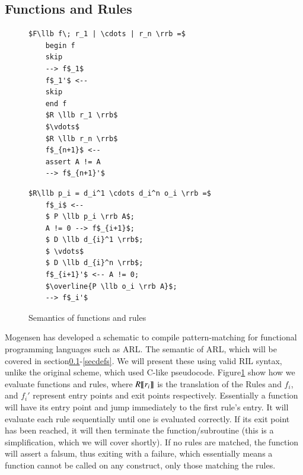 \documentclass[a4paper]{article}
\begin{document}
\subsection{Functions and Rules}
\label{secrules}
\begin{figure}[!htb]
\begin{minipage}{0.4\textwidth}
\begin{lstlisting}
$F\llb f\; r_1 | \cdots | r_n \rrb =$
    begin f
    skip
    --> f$_1$
    f$_1'$ <--
    skip
    end f
    $R \llb r_1 \rrb$
    $\vdots$
    $R \llb r_n \rrb$
    f$_{n+1}$ <--
    assert A != A
    --> f$_{n+1}'$
\end{lstlisting}
\end{minipage}
\qquad
\begin{minipage}{0.4\textwidth}
\begin{lstlisting}
$R\llb p_i = d_i^1 \cdots d_i^n o_i \rrb =$
    f$_i$ <--
    $ P \llb p_i \rrb A$;
    A != 0 --> f$_{i+1}$;
    $ D \llb d_{i}^1 \rrb$;
    $ \vdots$
    $ D \llb d_{i}^n \rrb$;
    f$_{i+1}'$ <-- A != 0;
    $\overline{P \llb o_i \rrb A}$;
    --> f$_i'$
\end{lstlisting}
\end{minipage}
\caption{Semantics of functions and rules}
\label{rules}
\end{figure}

Mogensen has developed a schematic to compile pattern-matching for functional programming languages such as ARL\cite{patterns}. The semantic of ARL, which will be covered in section\ref{secrules}-\ref{secdefs}. We will present these using valid RIL syntax, unlike the original scheme, which used C-like pseudocode. Figure\ref{rules} show how we evaluate functions and rules, where \(R \llbracket r_i \rrbracket\) is the translation of the Rules and \(f_i\), and  \(f_i'\) represent entry points and exit points respectively. Essentially a function will have its entry point and jump immediately to the first rule's entry. It will evaluate each rule sequentially until one is evaluated correctly. If its exit point has been reached, it will then terminate the function/subroutine (this is a simplification, which we will cover shortly). If no rules are matched, the function will assert a falsum, thus exiting with a failure, which essentially means a function cannot be called on any construct, only those matching the rules.
\end{document}
